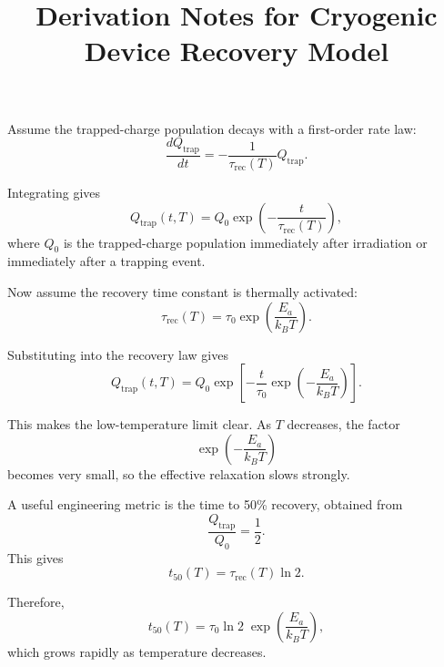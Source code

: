 \documentclass[11pt]{article}
\title{Derivation Notes for Cryogenic Device Recovery Model}
\begin{document}
\maketitle

Assume the trapped-charge population decays with a first-order rate law:
\[
\frac{dQ_{\mathrm{trap}}}{dt} = -\frac{1}{\tau_{\mathrm{rec}}(T)}Q_{\mathrm{trap}}.
\]

Integrating gives
\[
Q_{\mathrm{trap}}(t,T) = Q_0 \exp\!\left(-\frac{t}{\tau_{\mathrm{rec}}(T)}\right),
\]
where $Q_0$ is the trapped-charge population immediately after irradiation or immediately after a trapping event.

Now assume the recovery time constant is thermally activated:
\[
\tau_{\mathrm{rec}}(T)=\tau_0 \exp\!\left(\frac{E_a}{k_B T}\right).
\]

Substituting into the recovery law gives
\[
Q_{\mathrm{trap}}(t,T)=Q_0 \exp\!\left[-\frac{t}{\tau_0}\exp\!\left(-\frac{E_a}{k_B T}\right)\right].
\]

This makes the low-temperature limit clear. As $T$ decreases, the factor
\[
\exp\!\left(-\frac{E_a}{k_B T}\right)
\]
becomes very small, so the effective relaxation slows strongly.

A useful engineering metric is the time to 50\% recovery, obtained from
\[
\frac{Q_{\mathrm{trap}}}{Q_0}=\frac{1}{2}.
\]
This gives
\[
t_{50}(T)=\tau_{\mathrm{rec}}(T)\ln 2.
\]

Therefore,
\[
t_{50}(T)=\tau_0 \ln 2\; \exp\!\left(\frac{E_a}{k_B T}\right),
\]
which grows rapidly as temperature decreases.
\end{document}
